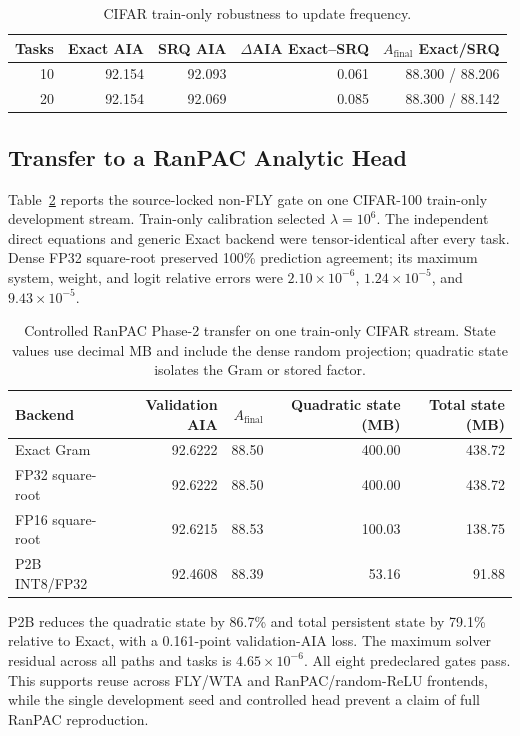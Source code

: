 \documentclass[runningheads]{llncs}
\begin{document}
\begin{table}
\caption{CIFAR train-only robustness to update frequency.}
\label{tab:frequency}
\centering
\small
\begin{tabular}{rrrrr}
\toprule
Tasks & Exact AIA & SRQ AIA & $\Delta$AIA Exact--SRQ &
$A_{\mathrm{final}}$ Exact/SRQ \\
\midrule
10 & 92.154 & 92.093 & 0.061 & 88.300 / 88.206 \\
20 & 92.154 & 92.069 & 0.085 & 88.300 / 88.142 \\
\bottomrule
\end{tabular}
\end{table}

\subsection{Transfer to a RanPAC Analytic Head}

Table~\ref{tab:ranpac-transfer} reports the source-locked non-FLY gate on one
CIFAR-100 train-only development stream. Train-only calibration selected
$\lambda=10^6$. The independent direct equations and generic Exact backend
were tensor-identical after every task. Dense FP32 square-root preserved 100\%
prediction agreement; its maximum system, weight, and logit relative errors
were $2.10\times10^{-6}$, $1.24\times10^{-5}$, and
$9.43\times10^{-5}$.

\begin{table}
\caption{Controlled RanPAC Phase-2 transfer on one train-only CIFAR stream.
State values use decimal MB and include the dense random projection; quadratic
state isolates the Gram or stored factor.}
\label{tab:ranpac-transfer}
\centering
\small
\begin{tabular}{lrrrr}
\toprule
Backend & Validation AIA & $A_{\mathrm{final}}$ & Quadratic state (MB) &
Total state (MB) \\
\midrule
Exact Gram & 92.6222 & 88.50 & 400.00 & 438.72 \\
FP32 square-root & 92.6222 & 88.50 & 400.00 & 438.72 \\
FP16 square-root & 92.6215 & 88.53 & 100.03 & 138.75 \\
P2B INT8/FP32 & 92.4608 & 88.39 & 53.16 & 91.88 \\
\bottomrule
\end{tabular}
\end{table}

P2B reduces the quadratic state by 86.7\% and total persistent state by
79.1\% relative to Exact, with a 0.161-point validation-AIA loss. The maximum
solver residual across all paths and tasks is $4.65\times10^{-6}$. All eight
predeclared gates pass. This supports reuse across FLY/WTA and
RanPAC/random-ReLU frontends, while the single development seed and controlled
head prevent a claim of full RanPAC reproduction.
\end{document}
